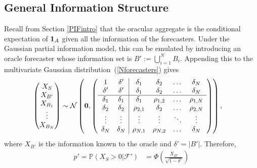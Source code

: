 \documentclass[11pt]{article}
\renewcommand{\P}{\mathbb{P}}
\theoremstyle{definition}
\theoremstyle{definition}
\def\one{{\bf 1}}
\def\P{{\mathbb P}}
\begin{document}
\subsection{General Information Structure}
Recall from Section \ref{PIFintro} that the oracular aggregate is the
conditional expectation of $\one_A$ given all the information of the
forecasters. Under the Gaussian partial information model, this can be
emulated by introducing an oracle forecaster whose information set is
$B' := \bigcup_{i=1}^N B_i$.  Appending this to the multivariate
Gaussian distribution~(\ref{Nforecasters}) gives
\begin{align}
\left(\begin{matrix} X_S \\ X_{B'} \\ X_{B_1}\\ \vdots \\ X_{B_N} 
 \end{matrix}\right) &\sim \mathcal{N}\left( 
 \boldsymbol{0}, 
% 
 \left(\begin{array}{c c| c c cc }
1 & \delta' & \delta_1 & \delta_2 & \dots & \delta_N  \\ 
\delta' & \delta' & \delta_1 & \delta_2 & \dots & \delta_N  \\ \hline
\delta_1& \delta_1 & \delta_1 &\rho_{1,2} & \dots & \rho_{1,N}   \\ 
\delta_2 & \delta_2 &\rho_{2,1} & \delta_2 & \dots & \rho_{2,N}  \\ 
\vdots &\vdots & \vdots & \vdots & \ddots & \vdots  \\ 
\delta_N &\delta_N & \rho_{N,1} & \rho_{N,2} & \dots & \delta_N\\ 
 \end{array}\right)\right), \label{oracleN}
\end{align}
where $X_{B'}$ is the information known to the oracle and $\delta' =
|B'|$.  Therefore,
 \begin{align*}
p' = \P(X_S > 0 |  \mathcal{F}') 
   &= \Phi\left( \frac{X_{B'}}{\sqrt{1-\delta'}} \right)
\end{align*}
\end{document}
